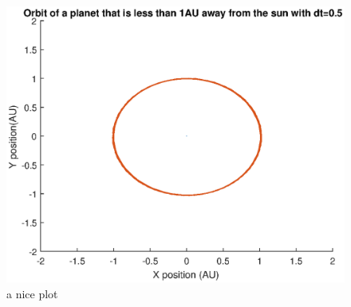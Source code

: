 \documentclass{article}
\begin{document}
\begin{figure}[h]
\centering
\includegraphics{Planeet_1AU_dt05_10jaar.eps}
\caption{a nice plot}
\label{fig:mesh1}
\end{figure}
\end{document}
